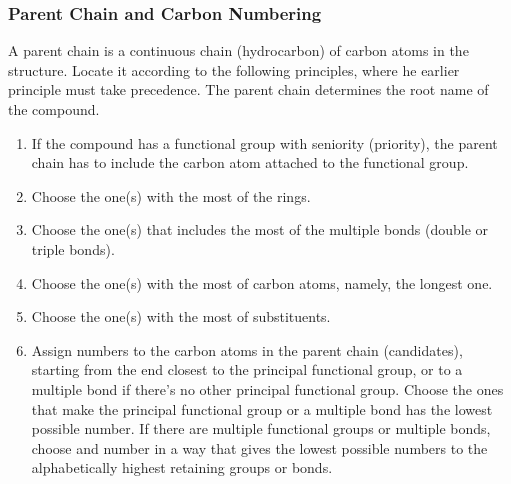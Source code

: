 \documentclass[a4paper,12pt]{report}
\begin{document}
\subsubsection{Parent Chain and Carbon Numbering}
A parent chain is a continuous chain (hydrocarbon) of carbon atoms in the structure. Locate it according to the following principles, where he earlier principle must take precedence. The parent chain determines the root name of the compound.
\begin{enumerate}
\item If the compound has a functional group with seniority (priority), the parent chain has to include the carbon atom attached to the functional group.
\item Choose the one(s) with the most of the rings.
\item Choose the one(s) that includes the most of the multiple bonds (double or triple bonds).
\item Choose the one(s) with the most of carbon atoms, namely, the longest one.
\item Choose the one(s) with the most of substituents.
\item Assign numbers to the carbon atoms in the parent chain (candidates), starting from the end closest to the principal functional group, or to a multiple bond if there's no other principal functional group. Choose the ones that make the principal functional group or a multiple bond has the lowest possible number. If there are multiple functional groups or multiple bonds, choose and number in a way that gives the lowest possible numbers to the alphabetically highest retaining groups or bonds.
\end{enumerate}
\end{document}
